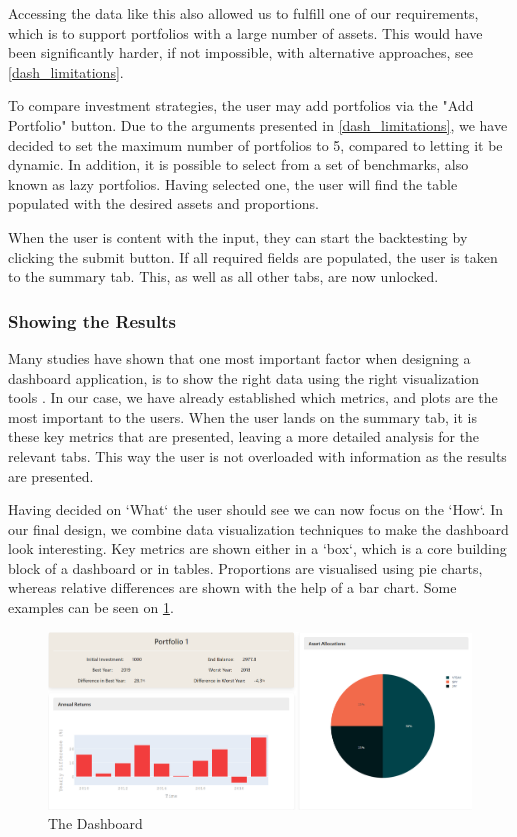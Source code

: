 \documentclass[main.tex]{subfiles}
\begin{document}
Accessing the data like this also allowed us to fulfill one of our requirements, which is to support portfolios with a large number of assets. This would have been significantly harder, if not impossible, with alternative approaches, see \ref{dash_limitations}.

To compare investment strategies, the user may add portfolios via the "Add Portfolio" button. Due to the arguments presented in \ref{dash_limitations}, we have decided to set the maximum number of portfolios to 5, compared to letting it be dynamic. In addition, it is possible to select from a set of benchmarks, also known as lazy portfolios. Having selected one, the user will find the table populated with the desired assets and proportions. 

When the user is content with the input, they can start the backtesting by clicking the submit button. If all required fields are populated, the user is taken to the summary tab. This, as well as all other tabs, are now unlocked.

\subsubsection*{Showing the Results}

Many studies have shown that one most important factor when designing a dashboard application, is to show the right data using the right visualization tools \cite{dashboard_design1} \cite{dashboard_design2}. In our case, we have already established which metrics, and plots are the most important to the users. When the user lands on the summary tab, it is these key metrics that are presented, leaving a more detailed analysis for the relevant tabs. This way the user is not overloaded with information as the results are presented. 

Having decided on `What` the user should see we can now focus on the `How`. In our final design, we combine data visualization techniques to make the dashboard look interesting. Key metrics are shown either in a `box`, which is a core building block of a dashboard or in tables. Proportions are visualised using pie charts, whereas relative differences are shown with the help of a bar chart. Some examples can be seen on \figurename{\ref{dashboard}}.

\begin{figure}[H]
   \centering
   \includegraphics[width=\textwidth]{04Design/04Pictures/dashboard.png}
   \caption{The Dashboard}
   \label{dashboard}
\end{figure}
\end{document}
